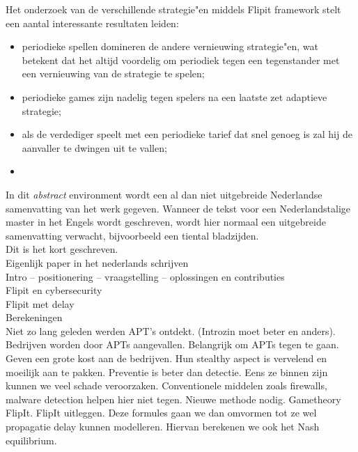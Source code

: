 \documentclass[master=cws, masteroption=vs]{kulemt}
\begin{document}
\begin{abstract*}
Het onderzoek van de verschillende strategie"en middels Flipit framework stelt een aantal interessante resultaten leiden:
\begin{itemize}
\item periodieke spellen domineren de andere vernieuwing strategie"en, wat betekent dat het altijd voordelig om periodiek tegen een tegenstander met een vernieuwing van de strategie te spelen;
\item periodieke games zijn nadelig tegen spelers na een laatste zet adaptieve strategie;
\item als de verdediger speelt met een periodieke tarief dat snel genoeg is zal hij de aanvaller te dwingen uit te vallen;
\item  
\end{itemize}

In dit \textit{abstract} environment wordt een al dan niet uitgebreide
Nederlandse samenvatting van het werk gegeven.
Wanneer de tekst voor een Nederlandstalige master in het Engels wordt
geschreven, wordt hier normaal een uitgebreide samenvatting verwacht,
bijvoorbeeld een tiental bladzijden. \\
  
Dit is het kort geschreven.\\ Eigenlijk paper in het nederlands schrijven \\
Intro -- positionering -- vraagstelling -- oplossingen en contributies \\
Flipit en cybersecurity\\
Flipit met delay \\
Berekeningen \\
Niet zo lang geleden werden APT's ontdekt. (Introzin moet beter en anders). Bedrijven worden door APTs aangevallen. Belangrijk om APTs tegen te gaan. Geven een grote kost aan de bedrijven. Hun stealthy aspect is vervelend en moeilijk aan te pakken. Preventie is beter dan detectie. Eens ze binnen zijn kunnen we veel schade veroorzaken. Conventionele middelen zoals firewalls, malware detection helpen hier niet tegen. Nieuwe methode nodig. Gametheory FlipIt. FlipIt uitleggen. Deze formules gaan we dan omvormen tot ze wel propagatie delay kunnen modelleren. Hiervan berekenen we ook het Nash equilibrium. 
\end{abstract*}

\listoffiguresandtables
\end{document}
